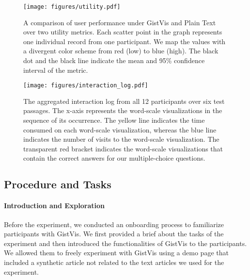 \begin{figure*}[tb]
  \centering
  \texttt{[image: figures/utility.pdf]}
  \caption{A comparison of user performance under GistVis and Plain Text over two utility metrics. Each scatter point in the graph represents one individual record from one participant. We map the values with a divergent color scheme from red (low) to blue (high). The black dot and the black line indicate the mean and 95\% confidence interval of the metric.}
  \label{fig:utility}
\end{figure*}


\begin{figure*}[tb]
  \centering
  \texttt{[image: figures/interaction\_log.pdf]}
  \caption{The aggregated interaction log from all 12 participants over six test passages. The x-axis represents the word-scale visualizations in the sequence of its occurrence. The yellow line indicates the time consumed on each word-scale visualization, whereas the blue line indicates the number of visits to the word-scale visualization. The transparent red bracket indicates the word-scale visualizations that contain the correct answers for our multiple-choice questions.}
  \label{fig:interation-log}
\end{figure*}

\subsection{Procedure and Tasks}
\paragraph{Introduction and Exploration}
Before the experiment, we conducted an onboarding process to familiarize participants with GistVis. We first provided a brief about the tasks of the experiment and then introduced the functionalities of GistVis to the participants. We allowed them to freely experiment with GistVis using a demo page that included a synthetic article not related to the text articles we used for the experiment.


